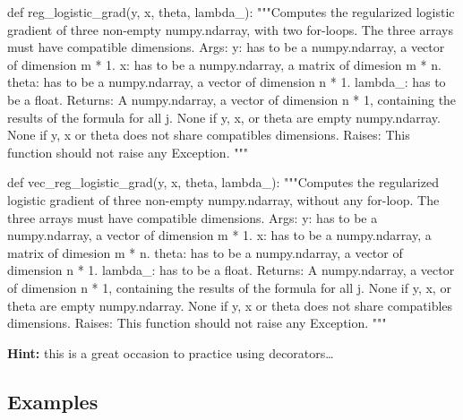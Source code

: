 \documentclass[]{article}
\newenvironment{Shaded}{\begin{snugshade}}{\end{snugshade}}
\newcommand{\CommentTok}[1]{\textcolor[rgb]{0.48,0.49,0.49}{#1}}
\newcommand{\KeywordTok}[1]{\textcolor[rgb]{0.81,0.81,0.76}{#1}}
\newcommand{\NormalTok}[1]{\textcolor[rgb]{0.81,0.81,0.76}{#1}}
\begin{document}
\begin{Shaded}
\begin{Highlighting}[]
\KeywordTok{def}\NormalTok{ reg_logistic_grad(y, x, theta, lambda_):}
    \CommentTok{"""Computes the regularized logistic gradient of three non-empty numpy.ndarray, with two for-loops. The three arrays must have compatible dimensions.}
\CommentTok{    Args:}
\CommentTok{      y: has to be a numpy.ndarray, a vector of dimension m * 1.}
\CommentTok{      x: has to be a numpy.ndarray, a matrix of dimesion m * n.}
\CommentTok{      theta: has to be a numpy.ndarray, a vector of dimension n * 1.}
\CommentTok{      lambda_: has to be a float.}
\CommentTok{    Returns:}
\CommentTok{      A numpy.ndarray, a vector of dimension n * 1, containing the results of the formula for all j.}
\CommentTok{      None if y, x, or theta are empty numpy.ndarray.}
\CommentTok{      None if y, x or theta does not share compatibles dimensions.}
\CommentTok{    Raises:}
\CommentTok{      This function should not raise any Exception.}
\CommentTok{    """}

\KeywordTok{def}\NormalTok{ vec_reg_logistic_grad(y, x, theta, lambda_):}
    \CommentTok{"""Computes the regularized logistic gradient of three non-empty numpy.ndarray, without any for-loop. The three arrays must have compatible dimensions.}
\CommentTok{    Args:}
\CommentTok{      y: has to be a numpy.ndarray, a vector of dimension m * 1.}
\CommentTok{      x: has to be a numpy.ndarray, a matrix of dimesion m * n.}
\CommentTok{      theta: has to be a numpy.ndarray, a vector of dimension n * 1.}
\CommentTok{      lambda_: has to be a float.}
\CommentTok{    Returns:}
\CommentTok{      A numpy.ndarray, a vector of dimension n * 1, containing the results of the formula for all j.}
\CommentTok{      None if y, x, or theta are empty numpy.ndarray.}
\CommentTok{      None if y, x or theta does not share compatibles dimensions.}
\CommentTok{    Raises:}
\CommentTok{      This function should not raise any Exception.}
\CommentTok{    """}
\end{Highlighting}
\end{Shaded}

\textbf{Hint:} this is a great occasion to practice using
decorators\ldots{}

\hypertarget{examples-7}{%
\subsection{Examples}\label{examples-7}}
\end{document}
